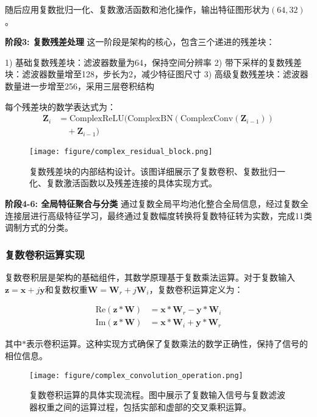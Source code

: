 \documentclass[conference]{IEEEtran}
\begin{document}
随后应用复数批归一化、复数激活函数和池化操作，输出特征图形状为$(64, 32)$。

\textbf{阶段3: 复数残差处理}
这一阶段是架构的核心，包含三个递进的残差块：

1) 基础复数残差块：滤波器数量为64，保持空间分辨率
2) 带下采样的复数残差块：滤波器数量增至128，步长为2，减少特征图尺寸
3) 高级复数残差块：滤波器数量进一步增至256，采用三层卷积结构

每个残差块的数学表达式为：
\begin{equation}
\begin{aligned}
\mathbf{Z}_i &= \text{ComplexReLU}(\text{ComplexBN}(\text{ComplexConv}(\mathbf{Z}_{i-1})) \\
&\quad + \mathbf{Z}_{i-1})
\end{aligned}
\end{equation}

\begin{figure}[htbp]
\centering
\texttt{[image: figure/complex\_residual\_block.png]}
\caption{复数残差块的内部结构设计。该图详细展示了复数卷积、复数批归一化、复数激活函数以及残差连接的具体实现方式。}
\label{fig:residual_block}
\end{figure}

\textbf{阶段4-6: 全局特征聚合与分类}
通过复数全局平均池化整合全局信息，经过复数全连接层进行高级特征学习，最终通过复数幅度转换将复数特征转为实数，完成11类调制方式的分类。

\subsubsection{复数卷积运算实现}

复数卷积层是架构的基础组件，其数学原理基于复数乘法运算。对于复数输入$\mathbf{z} = \mathbf{x} + j\mathbf{y}$和复数权重$\mathbf{W} = \mathbf{W}_r + j\mathbf{W}_i$，复数卷积运算定义为：

\begin{equation}
\begin{aligned}
\text{Re}(\mathbf{z} * \mathbf{W}) &= \mathbf{x} * \mathbf{W}_r - \mathbf{y} * \mathbf{W}_i \\
\text{Im}(\mathbf{z} * \mathbf{W}) &= \mathbf{x} * \mathbf{W}_i + \mathbf{y} * \mathbf{W}_r
\end{aligned}
\end{equation}

其中$*$表示卷积运算。这种实现方式确保了复数乘法的数学正确性，保持了信号的相位信息。

\begin{figure}[htbp]
\centering
\texttt{[image: figure/complex\_convolution\_operation.png]}
\caption{复数卷积运算的具体实现流程。图中展示了复数输入信号与复数滤波器权重之间的运算过程，包括实部和虚部的交叉乘积运算。}
\label{fig:complex_conv}
\end{figure}
\end{document}
